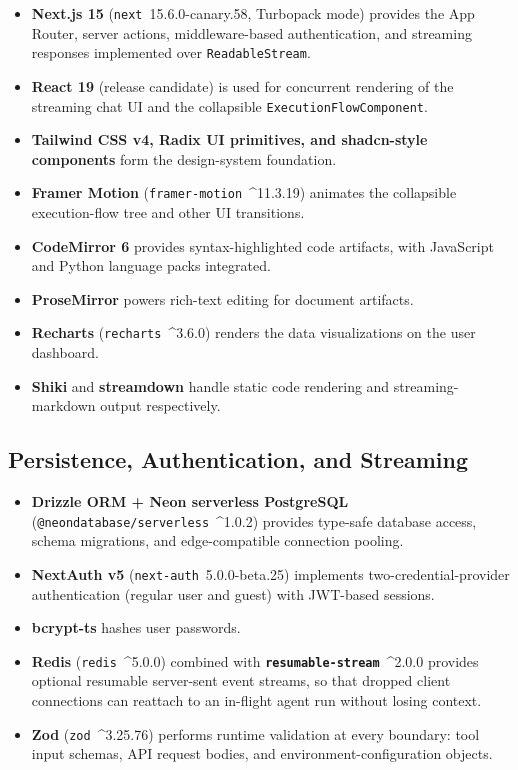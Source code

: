 \documentclass[11pt,a4paper]{report}
\newcommand{\code}[1]{\texttt{\small #1}}
\begin{document}
\begin{itemize}
  \item \textbf{Next.js 15} (\code{next}\ 15.6.0-canary.58, Turbopack mode) provides the App Router, server actions, middleware-based authentication, and streaming responses implemented over \code{ReadableStream}.
  \item \textbf{React 19} (release candidate) is used for concurrent rendering of the streaming chat UI and the collapsible \code{ExecutionFlowComponent}.
  \item \textbf{Tailwind CSS v4, Radix UI primitives, and shadcn-style components} form the design-system foundation.
  \item \textbf{Framer Motion} (\code{framer-motion}\ \^{}11.3.19) animates the collapsible execution-flow tree and other UI transitions.
  \item \textbf{CodeMirror 6} provides syntax-highlighted code artifacts, with JavaScript and Python language packs integrated.
  \item \textbf{ProseMirror} powers rich-text editing for document artifacts.
  \item \textbf{Recharts} (\code{recharts}\ \^{}3.6.0) renders the data visualizations on the user dashboard.
  \item \textbf{Shiki} and \textbf{streamdown} handle static code rendering and streaming-markdown output respectively.
\end{itemize}

\subsection{Persistence, Authentication, and Streaming}

\begin{itemize}
  \item \textbf{Drizzle ORM + Neon serverless PostgreSQL} (\code{@neondatabase/serverless}\ \^{}1.0.2) provides type-safe database access, schema migrations, and edge-compatible connection pooling.
  \item \textbf{NextAuth v5} (\code{next-auth}\ 5.0.0-beta.25) implements two-credential-provider authentication (regular user and guest) with JWT-based sessions.
  \item \textbf{bcrypt-ts} hashes user passwords.
  \item \textbf{Redis} (\code{redis}\ \^{}5.0.0) combined with \textbf{\code{resumable-stream}}\ \^{}2.0.0 provides optional resumable server-sent event streams, so that dropped client connections can reattach to an in-flight agent run without losing context.
  \item \textbf{Zod} (\code{zod}\ \^{}3.25.76) performs runtime validation at every boundary: tool input schemas, API request bodies, and environment-configuration objects.
\end{itemize}
\end{document}
